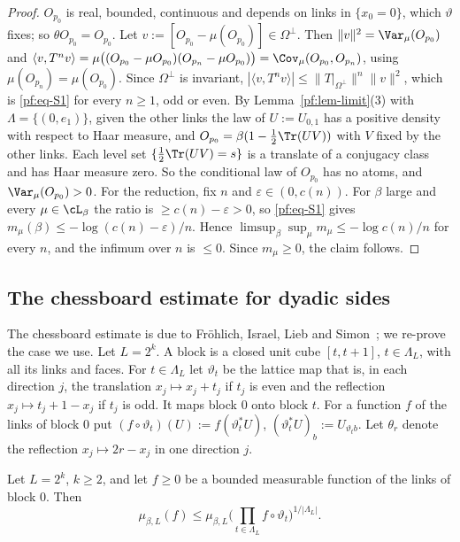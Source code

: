 \begin{proof}
$O_{p_0}$ is real, bounded, continuous and depends on links in $\{x_0=0\}$, which $\vartheta$ fixes; so $\theta O_{p_0}=O_{p_0}$. Let $v:=[O_{p_0}-\mu(O_{p_0})]\in\Omega^\perp$. Then $\|v\|^2=\Var_\mu(O_{p_0})$ and $\langle v,T^nv\rangle=\mu\big((O_{p_0}-\mu O_{p_0})(O_{p_n}-\mu O_{p_0})\big)=\Cov_\mu(O_{p_0},O_{p_n})$, using $\mu(O_{p_n})=\mu(O_{p_0})$. Since $\Omega^\perp$ is invariant, $|\langle v,T^nv\rangle|\le\|T|_{\Omega^\perp}\|^n\|v\|^2$, which is \eqref{pf:eq-S1} for every $n\ge1$, odd or even.
By Lemma~\ref{pf:lem-limit}(3) with $\Lambda=\{(0,e_1)\}$, given the other links the law of $U:=U_{0,1}$ has a positive density with respect to Haar measure, and $O_{p_0}=\beta(1-\tfrac12\Tr(UV))$ with $V$ fixed by the other links. Each level set $\{\tfrac12\Tr(UV)=s\}$ is a translate of a conjugacy class and has Haar measure zero. So the conditional law of $O_{p_0}$ has no atoms, and $\Var_\mu(O_{p_0})>0$.
For the reduction, fix $n$ and $\varepsilon\in(0,c(n))$. For $\beta$ large and every $\mu\in\cL_\beta$ the ratio is $\ge c(n)-\varepsilon>0$, so \eqref{pf:eq-S1} gives $m_\mu(\beta)\le-\log(c(n)-\varepsilon)/n$. Hence $\limsup_\beta\sup_\mu m_\mu\le-\log c(n)/n$ for every $n$, and the infimum over $n$ is $\le0$. Since $m_\mu\ge0$, the claim follows.
\end{proof}

\subsection{The chessboard estimate for dyadic sides}\label{pf:sec-chess}

The chessboard estimate is due to Fr\"oh\-lich, Israel, Lieb and Simon~\cite{FILS78}; we re-prove the case we use. Let $L=2^k$. A block is a closed unit cube $[t,t+1]$, $t\in\Lambda_L$, with all its links and faces. For $t\in\Lambda_L$ let $\vartheta_t$ be the lattice map that is, in each direction $j$, the translation $x_j\mapsto x_j+t_j$ if $t_j$ is even and the reflection $x_j\mapsto t_j+1-x_j$ if $t_j$ is odd. It maps block $0$ onto block $t$. For a function $f$ of the links of block $0$ put $(f\circ\vartheta_t)(U):=f(\vartheta_t^*U)$, $(\vartheta_t^*U)_b:=U_{\vartheta_tb}$. Let $\theta_r$ denote the reflection $x_j\mapsto2r-x_j$ in one direction $j$.

\begin{lemma}\label{pf:lem-chess}
Let $L=2^k$, $k\ge2$, and let $f\ge0$ be a bounded measurable function of the links of block $0$. Then
\[
\mu_{\beta,L}(f)\le\mu_{\beta,L}\Big(\prod_{t\in\Lambda_L}f\circ\vartheta_t\Big)^{1/|\Lambda_L|}.
\]
\end{lemma}

